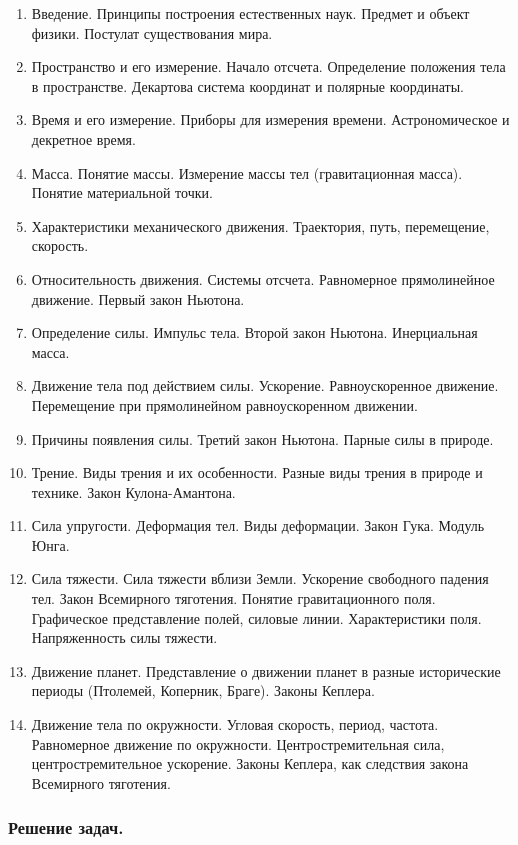 \documentclass[12pt,a4paper,oneside,draft]{scrartcl}
\begin{document}
\begin{enumerate}
\item Введение. Принципы построения естественных наук. Предмет и
  объект физики.  Постулат существования мира.
\item Пространство и его измерение. Начало отсчета. Определение
  положения тела в пространстве. Декартова система координат и
  полярные координаты.
\item Время и его измерение. Приборы для измерения
  времени. Астрономическое и декретное время.
\item Масса. Понятие массы. Измерение массы тел (гравитационная
  масса). Понятие материальной точки.
\item Характеристики механического движения. Траектория, путь,
  перемещение, скорость.
\item Относительность движения. Системы отсчета. Равномерное
  прямолинейное движение. Первый закон Ньютона.
\item Определение силы. Импульс тела. Второй закон
  Ньютона. Инерциальная масса.
\item Движение тела под действием силы. Ускорение. Равноускоренное
  движение. Перемещение при прямолинейном равноускоренном движении.
\item Причины появления силы. Третий закон Ньютона. Парные силы в
  природе.
\item Трение. Виды трения и их особенности. Разные виды трения в
  природе и технике. Закон Кулона-Амантона.
\item Сила упругости. Деформация тел. Виды деформации. Закон
  Гука. Модуль Юнга.
\item Сила тяжести. Сила тяжести вблизи Земли. Ускорение свободного
  падения тел. Закон Всемирного тяготения. Понятие гравитационного
  поля. Графическое представление полей, силовые линии.
  Характеристики поля. Напряженность силы тяжести.
\item Движение планет. Представление о движении планет в разные
  исторические периоды (Птолемей, Коперник, Браге). Законы Кеплера.
\item Движение тела по окружности. Угловая скорость, период,
  частота. Равномерное движение по окружности. Центростремительная
  сила, центростремительное ускорение. Законы Кеплера, как следствия
  закона Всемирного тяготения.
\end{enumerate}

\subsubsection{Решение задач.}
\label{sec:daily_8_problems}
\end{document}
